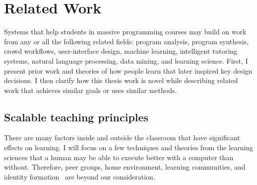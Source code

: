\chapter{Related Work}\label{chapter:relatedwork}



Systems that help students in massive programming courses may build on work from any or all the following related fields: program analysis, program synthesis, crowd workflows, user-interface design, machine learning, intelligent tutoring systems, natural language processing, data mining, and learning science. First, I present prior work and theories of how people learn that later inspired key design decisions. I then clarify how this thesis work is novel while describing related work that achieves similar goals or uses similar methods. %

\section{Scalable teaching principles}




There are many factors inside and outside the classroom that have significant effects on learning. I will focus on a few techniques and theories from the learning sciences that a human may be able to execute better with a computer than without. Therefore, peer groups, home environment, learning communities, and identity formation~\cite{walberg1984improving,case2008education} are beyond our consideration. 

